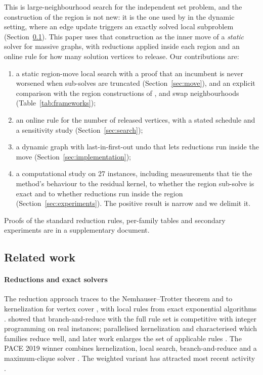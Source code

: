 \documentclass[review,authoryear,11pt]{elsarticle}
\theoremstyle{definition}
\begin{document}
This is large-neighbourhood search \citep{hashimoto2019,katzmann2017} for the
independent set problem, and the construction of the region is not new: it is the
one used by \citet{borowitz2025} in the dynamic setting, where an edge update
triggers an exactly solved local subproblem (Section~\ref{sec:related}). This paper
uses that construction as the inner move of a \emph{static} solver for massive
graphs, with reductions applied inside each region and an online rule for how many
solution vertices to release. Our contributions are:
\begin{enumerate}
\item a static region-move local search with a proof that an incumbent is never
      worsened when sub-solves are truncated (Section~\ref{sec:move}), and an
      explicit comparison with the region constructions of \citet{borowitz2025},
      \citet{hashimoto2019} and swap neighbourhoods (Table~\ref{tab:frameworks});
\item an online rule for the number of released vertices, with a stated schedule
      and a sensitivity study (Section~\ref{sec:search});
\item a dynamic graph with last-in-first-out undo that lets reductions run inside
      the move (Section~\ref{sec:implementation});
\item a computational study on 27 instances, including measurements that tie the
      method's behaviour to the residual kernel, to whether the region sub-solve is
      exact and to whether reductions run inside the region
      (Section~\ref{sec:experiments}). The positive result is narrow and we
      delimit it.
\end{enumerate}
Proofs of the standard reduction rules, per-family tables and secondary experiments
are in a supplementary document.

\subsection{Related work}
\label{sec:related}

\paragraph{Reductions and exact solvers} The reduction approach traces to the
Nemhauser--Trotter theorem \citep{nemhauser1975} and to kernelization for vertex
cover \citep{chen2001,abukhzam2007}, with local rules from exact exponential
algorithms \citep{tarjan1977,fomin2009,xiao2013,xiao2017}.
\citet{akiba2016} showed that branch-and-reduce with the full rule set is
competitive with integer programming on real instances; \citet{hespe2019}
parallelised kernelization and characterised which families reduce well, and later
work enlarges the set of applicable rules \citep{gellner2021,figiel2022,hespe2021}.
The PACE 2019 winner \citep{pace2019,hespe2020} combines kernelization, local search,
branch-and-reduce and a maximum-clique solver \citep{li2017momc}. The weighted
variant has attracted most recent activity
\citep{lamm2019,xiaowww2021,grossmann2023,langedal2022,grossmann2024survey,grossmann2025chils}.
\end{document}
